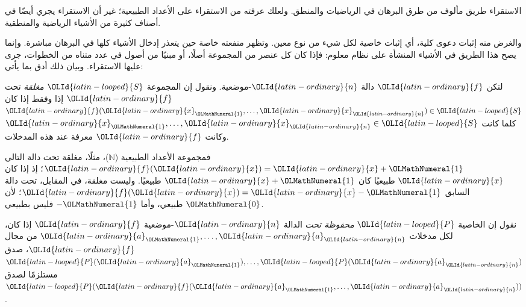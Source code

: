 \documentclass[../../../include/open-logic-section]{subfiles}
\begin{document}


\begin{explain}
الاستقراء طريق مألوف من طرق البرهان في الرياضيات والمنطق. ولعلك عرفته من
الاستقراء على الأعداد الطبيعية؛ غير أن الاستقراء يجري أيضًا في أصناف
كثيرة من الأشياء الرياضية والمنطقية.

والغرض منه إثبات دعوى كلية، أي إثبات خاصية لكل شيء من نوع معين. وتظهر
منفعته خاصة حين يتعذر إدخال الأشياء كلها في البرهان مباشرة. وإنما يصح
هذا الطريق في الأشياء المنشأة على نظام معلوم: فإذا كان كل عنصر من
المجموعة أصلًا، أو مبنيًا من أصول في عدد متناه من الخطوات، جرى عليها
الاستقراء. وبيان ذلك أدق بما يأتي:
\end{explain}

\begin{defn}
لتكن ${\OLId{latin-ordinary}{f}}$ دالة ${\OLId{latin-ordinary}{n}}$-موضعية. ونقول إن المجموعة ${\OLId{latin-looped}{S}}$ \emph{مغلقة} تحت ${\OLId{latin-ordinary}{f}}$
إذا وفقط إذا كان ${\OLId{latin-ordinary}{f}}({\OLId{latin-ordinary}{x}}_{\OLMathNumeral{1}},\dots,{\OLId{latin-ordinary}{x}}_{\OLId{latin-ordinary}{n}}) \in {\OLId{latin-looped}{S}}$ كلما كانت
${\OLId{latin-ordinary}{x}}_{\OLMathNumeral{1}},\dots,{\OLId{latin-ordinary}{x}}_{\OLId{latin-ordinary}{n}} \in {\OLId{latin-looped}{S}}$ وكانت ${\OLId{latin-ordinary}{f}}$ معرفة عند هذه المدخلات.
\end{defn}

\begin{explain}
فمجموعة الأعداد الطبيعية ($\mathbb{N}$)، مثلًا، مغلقة تحت دالة التالي
${\OLId{latin-ordinary}{f}}({\OLId{latin-ordinary}{x}}) = {\OLId{latin-ordinary}{x}}+{\OLMathNumeral{1}}$؛ إذ إذا كان ${\OLId{latin-ordinary}{x}}$ طبيعيًا كان ${\OLId{latin-ordinary}{x}}+{\OLMathNumeral{1}}$ طبيعيًا. وليست مغلقة،
في المقابل، تحت دالة السابق ${\OLId{latin-ordinary}{f}}({\OLId{latin-ordinary}{x}}) = {\OLId{latin-ordinary}{x}}-{\OLMathNumeral{1}}$؛ لأن ${\OLMathNumeral{0}}$ طبيعي، وأما $-{\OLMathNumeral{1}}$
فليس بطبيعي.
\end{explain}

\begin{defn}
نقول إن الخاصية ${\OLId{latin-looped}{P}}$ \emph{محفوظة تحت} الدالة ${\OLId{latin-ordinary}{n}}$-موضعية ${\OLId{latin-ordinary}{f}}$ إذا كان،
لكل مدخلات ${\OLId{latin-ordinary}{a}}_{\OLMathNumeral{1}},\dots,{\OLId{latin-ordinary}{a}}_{\OLId{latin-ordinary}{n}}$ من مجال ${\OLId{latin-ordinary}{f}}$، صدق
${\OLId{latin-looped}{P}}({\OLId{latin-ordinary}{a}}_{\OLMathNumeral{1}}),\dots,{\OLId{latin-looped}{P}}({\OLId{latin-ordinary}{a}}_{\OLId{latin-ordinary}{n}})$ مستلزمًا لصدق ${\OLId{latin-looped}{P}}({\OLId{latin-ordinary}{f}}({\OLId{latin-ordinary}{a}}_{\OLMathNumeral{1}},\dots,{\OLId{latin-ordinary}{a}}_{\OLId{latin-ordinary}{n}}))$.
\end{defn}
\end{document}
